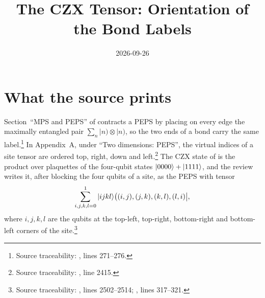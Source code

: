 \documentclass{article}
\title{The CZX Tensor: Orientation of the Bond Labels}
\author{}
\date{2026-09-26}
\begin{document}
\maketitle
{}

\section{What the source prints}
Section~``MPS and PEPS'' of \cite{Cirac2021Matrix} contracts a PEPS by
placing on every edge the maximally entangled pair
$\sum_{n}\lvert n)\otimes\lvert n)$, so the two ends of a bond carry the same
label.\footnote{Source traceability:
    , lines 271--276.}
In Appendix~A, under ``Two dimensions: PEPS'', the virtual indices of a site
tensor are ordered top, right, down and left.\footnote{Source traceability:
    , line 2415.}
The CZX state of \cite{ChenLiuWen2011CZX} is the product over plaquettes of
the four-qubit states $|0000\rangle+|1111\rangle$, and the review writes it,
after blocking the four qubits of a site, as the PEPS with tensor
\begin{align}
    \sum_{i,j,k,l=0}^{1}|ijkl\rangle\bigl((i,j),(j,k),(k,l),(l,i)\bigr|,
    \label{eq:rmp_peps_czx_printed_tensor}
\end{align}
where $i,j,k,l$ are the qubits at the top-left, top-right, bottom-right and
bottom-left corners of the site.\footnote{Source traceability:
    , lines 2502--2514;
    , lines 317--321.}
\end{document}
